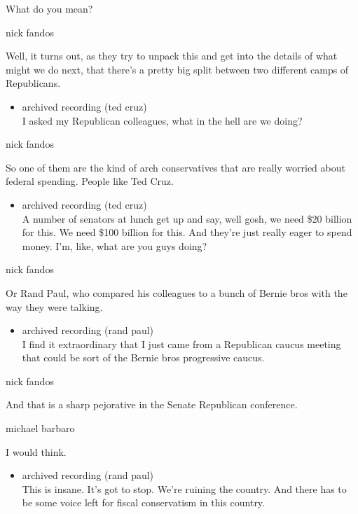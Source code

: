 What do you mean?

nick fandos

Well, it turns out, as they try to unpack this and get into the details
of what might we do next, that there's a pretty big split between two
different camps of Republicans.

\begin{itemize}
\tightlist
\item
  archived recording (ted cruz)\\
  I asked my Republican colleagues, what in the hell are we doing?
\end{itemize}

nick fandos

So one of them are the kind of arch conservatives that are really
worried about federal spending. People like Ted Cruz.

\begin{itemize}
\tightlist
\item
  archived recording (ted cruz)\\
  A number of senators at lunch get up and say, well gosh, we need \$20
  billion for this. We need \$100 billion for this. And they're just
  really eager to spend money. I'm, like, what are you guys doing?
\end{itemize}

nick fandos

Or Rand Paul, who compared his colleagues to a bunch of Bernie bros with
the way they were talking.

\begin{itemize}
\tightlist
\item
  archived recording (rand paul)\\
  I find it extraordinary that I just came from a Republican caucus
  meeting that could be sort of the Bernie bros progressive caucus.
\end{itemize}

nick fandos

And that is a sharp pejorative in the Senate Republican conference.

michael barbaro

I would think.

\begin{itemize}
\tightlist
\item
  archived recording (rand paul)\\
  This is insane. It's got to stop. We're ruining the country. And there
  has to be some voice left for fiscal conservatism in this country.
\end{itemize}

